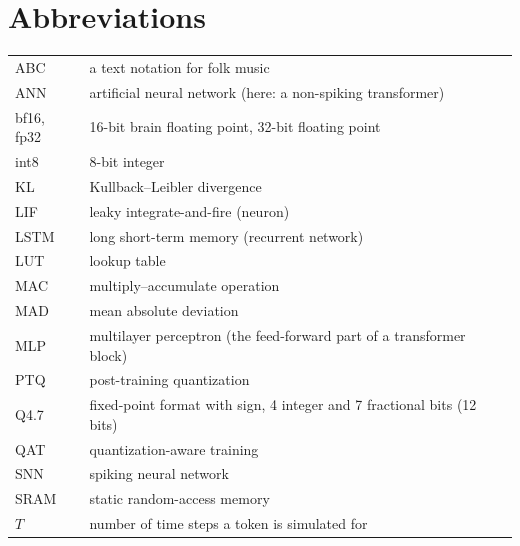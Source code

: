 \chapter*{Abbreviations}

\begin{tabular}{ll}
ABC & a text notation for folk music \\
ANN & artificial neural network (here: a non-spiking transformer) \\
bf16, fp32 & 16-bit brain floating point, 32-bit floating point \\
int8 & 8-bit integer \\
KL & Kullback--Leibler divergence \\
LIF & leaky integrate-and-fire (neuron) \\
LSTM & long short-term memory (recurrent network) \\
LUT & lookup table \\
MAC & multiply--accumulate operation \\
MAD & mean absolute deviation \\
MLP & multilayer perceptron (the feed-forward part of a transformer block) \\
PTQ & post-training quantization \\
Q4.7 & fixed-point format with sign, 4 integer and 7 fractional bits (12 bits) \\
QAT & quantization-aware training \\
SNN & spiking neural network \\
SRAM & static random-access memory \\
$T$ & number of time steps a token is simulated for \\
\end{tabular}

